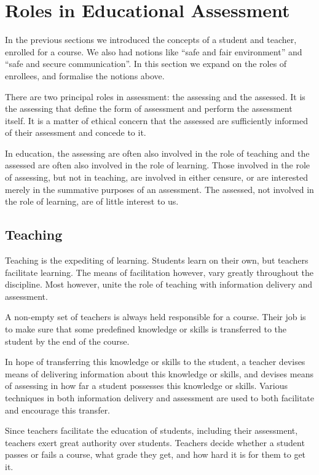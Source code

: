 
\section{Roles in Educational Assessment}

In the previous sections we introduced the concepts of a student and teacher,
enrolled for a course. We also had notions like ``safe and fair environment''
and ``safe and secure communication''. In this section we expand on the roles
of enrollees, and formalise the notions above.

There are two principal roles in assessment: the assessing and the assessed.
It is the assessing that define the form of assessment and perform the
assessment itself. It is a matter of ethical concern that the assessed are
sufficiently informed of their assessment and concede to it.

In education, the assessing are often also involved in the role of teaching and
the assessed are often also involved in the role of learning. Those involved in
the role of assessing, but not in teaching, are involved in either censure, or
are interested merely in the summative purposes of an assessment. The assessed,
not involved in the role of learning, are of little interest to us.

\subsection{Teaching}

Teaching is the expediting of learning. Students learn on their own, but
teachers facilitate learning\cite{skinner-1965}. The means of facilitation
however, vary greatly throughout the discipline\cite{ramsden-1992,kember-1997}.
Most however, unite the role of teaching with information delivery and
assessment.

A non-empty set of teachers is always held responsible for a course. Their job
is to make sure that some predefined knowledge or skills is transferred to the
student by the end of the course.

In hope of transferring this knowledge or skills to the student, a teacher
devises means of delivering information about this knowledge or skills, and
devises means of assessing in how far a student possesses this knowledge or
skills. Various techniques in both information delivery and assessment are used
to both facilitate and encourage this transfer.

Since teachers facilitate the education of students, including their
assessment, teachers exert great authority over students. Teachers decide
whether a student passes or fails a course, what grade they get, and how hard
it is for them to get it.

